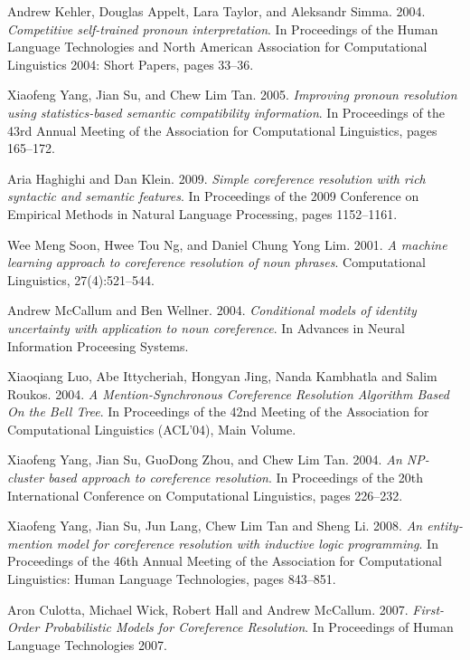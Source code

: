 \documentclass[12pt]{report}
\begin{document}
\begin{thebibliography}{30}
	Andrew Kehler, Douglas Appelt, Lara Taylor, and Aleksandr Simma. 2004.
	\textit{Competitive self-trained pronoun interpretation}.
	In Proceedings of the Human Language Technologies and North American Association for Computational Linguistics 2004: Short Papers, pages 33–36.

	Xiaofeng Yang, Jian Su, and Chew Lim Tan. 2005.
	\textit{Improving pronoun resolution using statistics-based semantic compatibility information}.
	In Proceedings of the 43rd Annual Meeting of the Association for Computational Linguistics, pages 165–172.

	Aria Haghighi and Dan Klein. 2009.
	\textit{Simple coreference resolution with rich syntactic and semantic features}.
	In Proceedings of the 2009 Conference on Empirical Methods in Natural Language Processing, pages 1152–1161.

	Wee Meng Soon, Hwee Tou Ng, and Daniel Chung Yong Lim. 2001.
	\textit{A machine learning approach to coreference resolution of noun phrases}.
	Computational Linguistics, 27(4):521–544.

	Andrew McCallum and Ben Wellner. 2004.
	\textit{Conditional models of identity uncertainty with application to noun coreference}.
	In Advances in Neural Information Proceesing Systems.

	Xiaoqiang Luo, Abe Ittycheriah, Hongyan Jing, Nanda Kambhatla and Salim Roukos. 2004.
	\textit{A Mention-Synchronous Coreference Resolution Algorithm Based On the Bell Tree}.
	In Proceedings of the 42nd Meeting of the Association for Computational Linguistics (ACL'04), Main Volume.

	Xiaofeng Yang, Jian Su, GuoDong Zhou, and Chew Lim Tan. 2004.
	\textit{An NP-cluster based approach to coreference resolution}.
	In Proceedings of the 20th International Conference on Computational Linguistics, pages 226–232.

	Xiaofeng Yang, Jian Su, Jun Lang, Chew Lim Tan and Sheng Li. 2008.
	\textit{An entity-mention model for coreference resolution with inductive logic programming}.
	In Proceedings of the 46th Annual Meeting of the Association for Computational Linguistics: Human Language Technologies, pages 843–851.

	Aron Culotta, Michael Wick, Robert Hall and Andrew McCallum. 2007.
	\textit{First-Order Probabilistic Models for Coreference Resolution}.
	In Proceedings of Human Language Technologies 2007.


\end{thebibliography}
\end{document}
